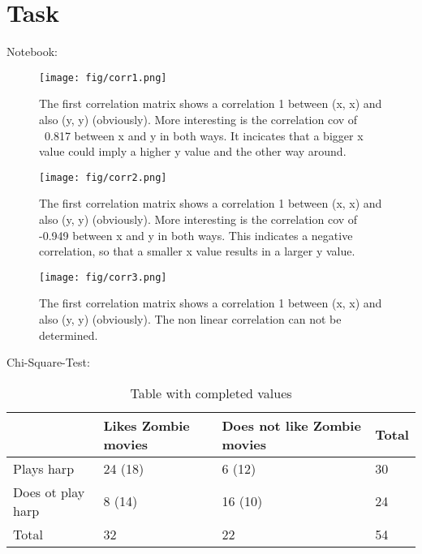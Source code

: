 \documentclass[a4paper, 11pt]{article}
\begin{document}
\newpage

\section{Task}

Notebook:

\begin{figure}[h!] 
    \centering
    \texttt{[image: fig/corr1.png]}
    \caption{The first correlation matrix shows a correlation 1 between (x, x) and also (y, y) (obviously). More interesting is the correlation cov of ~0.817 between x and y in both ways. It incicates that a bigger x value could imply a higher y value and the other way around.}
\end{figure}

\newpage

\begin{figure}[h!] 
    \centering
    \texttt{[image: fig/corr2.png]}
    \caption{The first correlation matrix shows a correlation 1 between (x, x) and also (y, y) (obviously). More interesting is the correlation cov of -0.949 between x and y in both ways. This indicates a negative correlation, so that a smaller x value results in a larger y value.}
\end{figure}

\newpage

\begin{figure}[h!] 
    \centering
    \texttt{[image: fig/corr3.png]}
    \caption{The first correlation matrix shows a correlation 1 between (x, x) and also (y, y) (obviously). The non linear correlation can not be determined.}
\end{figure}

Chi-Square-Test:

\begin{table}[h!]
    \centering
    \begin{tabular}{ p{3cm}|p{4cm}|p{4cm}|p{2cm}}
        &Likes Zombie movies &Does not like Zombie movies&Total\\
        \hline
        Plays harp   & 24 (18)&6 (12)&30\\
        \hline
        Does ot play harp&8 (14)&16 (10)&24\\
        \hline
        Total&32&22&54\\
    \end{tabular}
    \caption{Table with completed values}
    \label{table:1}
\end{table}
\end{document}
